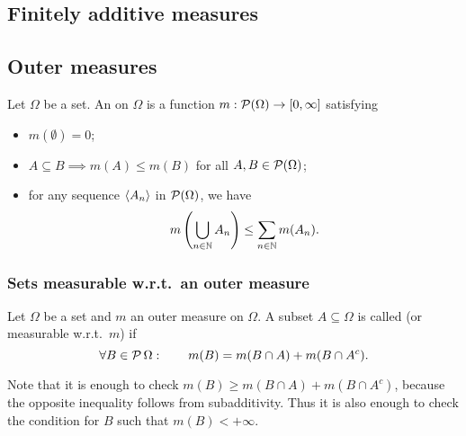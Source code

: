 \subsection{Finitely additive measures}

\subsection{Outer measures}
\begin{definition}
Let $\Omega$ be a set. An  on $\Omega$ is a function $m: \operatorname{\mathcal{P}}(\Omega) \to [0,\infty]$ satisfying
\begin{itemize}
\item $m(\emptyset) = 0$;
\item $A\subseteq B \implies m(A) \leq m(B)$ for all $A,B\in\operatorname{\mathcal{P}}(\Omega)$;
\item for any sequence $\left\langle A_n \right\rangle$ in $\operatorname{\mathcal{P}}(\Omega)$, we have
\[ m\left(\bigcup_{n\in\mathbb{N}}A_n\right) \leq \sum_{n\in\mathbb{N}}m(A_n). \]
\end{itemize}
\end{definition}

\subsubsection{Sets measurable w.r.t.\ an outer measure}
\begin{definition}
Let $\Omega$ be a set and $m$ an outer measure on $\Omega$. A subset $A\subseteq \Omega$ is called  (or measurable w.r.t.\ $m$) if
\[ \forall B\in\operatorname{\mathcal{P}}{\Omega}: \qquad m(B) = m(B\cap A) + m(B\cap A^c). \]
\end{definition}
Note that it is enough to check $m(B) \geq m(B\cap A) + m(B\cap A^c)$, because the opposite inequality follows from subadditivity. Thus it is also enough to check the condition for $B$ such that $m(B) < +\infty$.

